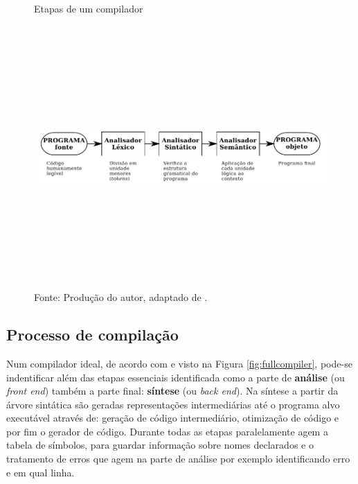 \begin{figure}[h]
  \caption{\ifdraft{\color{green}}{}Etapas de um compilador}\label{fig:compilador}
  \centering
\includegraphics[width=\textwidth,height=10cm,keepaspectratio]{figures/etapas-compilador.pdf}
  \caption*{\ifdraft{\color{green}}{}\footnotesize Fonte: Produção do autor, adaptado de .}
\end{figure}

\subsection{Processo de compilação}

Num compilador ideal, de acordo com  e visto na Figura \ref{fig:fullcompiler}, pode-se indentificar além das etapas essenciais identificada como a parte de \textbf{análise} (ou \textit{front end}) também a parte final: \textbf{síntese} (ou \textit{back end}). Na síntese a partir da árvore sintática são geradas representações intermediárias até o programa alvo executável através de: geração de código intermediário, otimização de código e por fim o gerador de código. Durante todas as etapas paralelamente agem a tabela de símbolos, para guardar informação sobre nomes declarados e o tratamento de erros que agem na parte de análise por exemplo identificando erro e em qual linha.

